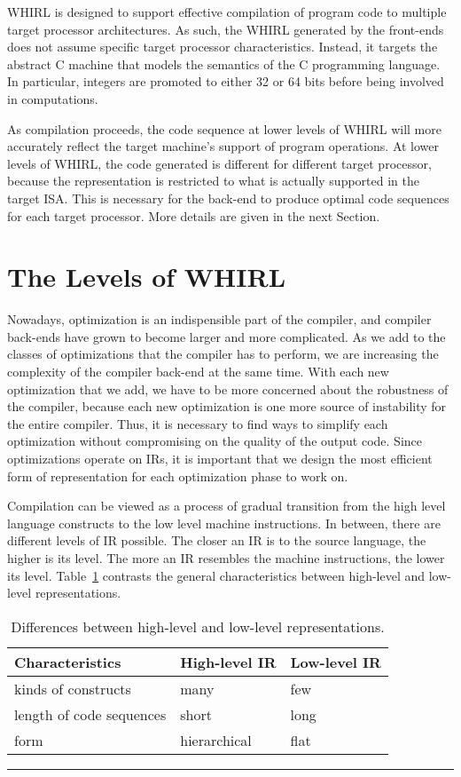 \documentclass{article}
\begin{document}
WHIRL is designed to support effective compilation of program code
to multiple target processor architectures. As such, the WHIRL
generated by the front-ends does not assume specific target processor
characteristics. Instead, it targets the abstract C machine that
models the semantics of the C programming language. In particular,
integers are promoted to either 32 or 64 bits before
being involved in computations. 

As compilation proceeds, the code
sequence at lower levels of WHIRL will more accurately reflect the
target machine's support of program operations. At lower levels of
WHIRL, the code generated is different for different target processor,
because the representation is restricted to what is actually
supported in the target ISA. This is necessary for the back-end to
produce optimal code sequences for each target processor. More
details are given in the next Section.

\section{The Levels of WHIRL}

Nowadays, optimization is an indispensible part of the compiler,
and compiler back-ends have grown to become larger and more complicated.
As we add to the classes of optimizations that the compiler has to
perform, we are increasing the complexity of the compiler back-end
at the same time. With each new optimization that we add, we have
to be more concerned about the robustness of the compiler, because
each new optimization is one more source of instability for the
entire compiler. Thus, it is necessary to find ways to simplify each
optimization without compromising on the quality of the output
code. Since optimizations operate on IRs, it is important that we
design the most efficient form of representation for each optimization
phase to work on. 

Compilation can be viewed as a process of gradual
transition from the high level language constructs to the low level
machine instructions. In between, there are different levels of IR
possible. The closer an IR is to the source language, the higher is
its level. The more an IR resembles the machine instructions, the 
lower its level. 
Table~\ref{hl-ll-level-diffs}
contrasts the general characteristics between high-level 
and low-level representations.

\begin{table}
\begin{center}
\begin{tabular}{|l||l|l|}
\hline
Characteristics 		& High-level IR   & Low-level IR\\\hline\hline
kinds of constructs 		& many 		  & few \\
length of code sequences 	& short 	  & long \\
form 				& hierarchical    & flat \\ \hline
\end{tabular}
\end{center}
\hrule
\caption{Differences between high-level and low-level representations.}
\label{hl-ll-level-diffs}
\end{table}
\end{document}
